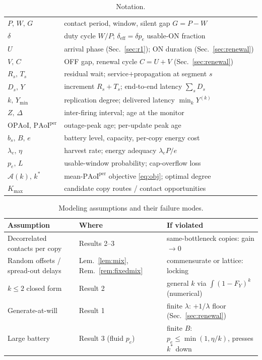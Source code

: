 \documentclass[twocolumn,3p,times,procedia]{elsarticle}
\newcommand{\AoI}{\Delta}
\newcommand{\OPAoI}{\mathrm{OPAoI}}
\newcommand{\PAoIper}{\mathrm{PAoI}^{\mathrm{per}}}
\newcommand{\Ymin}{Y_{\min}}
\newcommand{\dutyeff}{\delta_{\mathrm{eff}}}
\newcommand{\peff}{p_e}
\newcommand{\kstar}{k^{\ast}}
\begin{document}
\begin{table}[t]
\caption{Notation.}
\label{tab:notation}
\centering
\renewcommand{\arraystretch}{1.12}
\setlength{\tabcolsep}{4pt}
\footnotesize
\begin{tabular}{ll}
\hline
$P,\,W,\,G$ & contact period, window, silent gap $G=P-W$ \\
$\delta$ & duty cycle $W/P$;\; $\dutyeff=\delta\peff$ usable-ON fraction \\
$U$ & arrival phase (Sec.~\ref{sec:r1}); ON duration (Sec.~\ref{sec:renewal}) \\
$V,\,C$ & OFF gap, renewal cycle $C=U+V$ (Sec.~\ref{sec:renewal}) \\
$R_s,\,T_s$ & residual wait; service$+$propagation at segment $s$ \\
$D_s,\,Y$ & increment $R_s{+}T_s$; end-to-end latency $\sum_s D_s$ \\
$k,\,\Ymin$ & replication degree; delivered latency $\min_k Y^{(k)}$ \\
$Z,\,\AoI$ & inter-firing interval; age at the monitor \\
$\OPAoI,\,\PAoIper$ & outage-peak age; per-update peak age \\
$b_s,\,B,\,e$ & battery level, capacity, per-copy energy cost \\
$\lambda_e,\,\eta$ & harvest rate; energy adequacy $\lambda_e P/e$ \\
$\peff,\,L$ & usable-window probability; cap-overflow loss \\
$\mathcal{A}(k),\,\kstar$ & mean-$\PAoIper$ objective \eqref{eq:obj}; optimal degree \\
$K_{\max}$ & candidate copy routes / contact opportunities \\
\hline
\end{tabular}
\end{table}

\begin{table}[t]
\caption{Modeling assumptions and their failure modes.}
\label{tab:assumptions}
\centering
\renewcommand{\arraystretch}{1.2}
\begin{tabular}{p{2.5cm}p{1.1cm}p{3.3cm}}
\hline
Assumption & Where & If violated \\
\hline
Decorrelated contacts per copy & Results 2--3 & same-bottleneck copies: gain $\to 0$ \\
Random offsets / spread-out delays & Lem.~\ref{lem:mix}, Rem.~\ref{rem:fixedmix} & commensurate or lattice: locking \\
$k\le 2$ closed form & Result 2 & general $k$ via $\int(1-F_Y)^k$ (numerical) \\
Generate-at-will & Result 1 & finite $\lambda$: $+1/\lambda$ floor (Sec.~\ref{sec:renewal}) \\
Large battery & Result 3 (fluid $\peff$) & finite $B$: $\peff\le\min(1,\eta/k)$, presses $\kstar$ down \\
\hline
\end{tabular}
\end{table}
\end{document}
